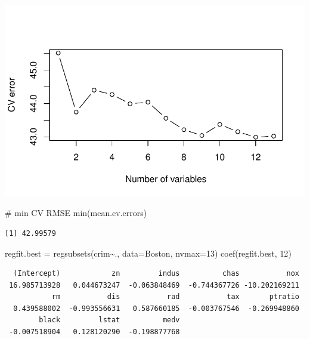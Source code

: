 \documentclass[
  letterpaper,
  DIV=11,
  numbers=noendperiod]{scrartcl}
\newenvironment{Shaded}{\begin{snugshade}}{\end{snugshade}}
\newcommand{\AttributeTok}[1]{\textcolor[rgb]{0.40,0.45,0.13}{#1}}
\newcommand{\CommentTok}[1]{\textcolor[rgb]{0.37,0.37,0.37}{#1}}
\newcommand{\DecValTok}[1]{\textcolor[rgb]{0.68,0.00,0.00}{#1}}
\newcommand{\FunctionTok}[1]{\textcolor[rgb]{0.28,0.35,0.67}{#1}}
\newcommand{\NormalTok}[1]{\textcolor[rgb]{0.00,0.23,0.31}{#1}}
\newcommand{\OtherTok}[1]{\textcolor[rgb]{0.00,0.23,0.31}{#1}}
\newcommand{\SpecialCharTok}[1]{\textcolor[rgb]{0.37,0.37,0.37}{#1}}
\begin{document}
\begin{center}
\includegraphics{hw3_files/figure-pdf/unnamed-chunk-15-1.pdf}
\end{center}

\begin{Shaded}
\begin{Highlighting}[]
\CommentTok{\# min CV RMSE}
\FunctionTok{min}\NormalTok{(mean.cv.errors)}
\end{Highlighting}
\end{Shaded}

\begin{verbatim}
[1] 42.99579
\end{verbatim}

\begin{Shaded}
\begin{Highlighting}[]
\NormalTok{regfit.best }\OtherTok{=} \FunctionTok{regsubsets}\NormalTok{(crim}\SpecialCharTok{\textasciitilde{}}\NormalTok{., }\AttributeTok{data=}\NormalTok{Boston, }\AttributeTok{nvmax=}\DecValTok{13}\NormalTok{)}
\FunctionTok{coef}\NormalTok{(regfit.best, }\DecValTok{12}\NormalTok{)}
\end{Highlighting}
\end{Shaded}

\begin{verbatim}
  (Intercept)            zn         indus          chas           nox 
 16.985713928   0.044673247  -0.063848469  -0.744367726 -10.202169211 
           rm           dis           rad           tax       ptratio 
  0.439588002  -0.993556631   0.587660185  -0.003767546  -0.269948860 
        black         lstat          medv 
 -0.007518904   0.128120290  -0.198877768 
\end{verbatim}
\end{document}
